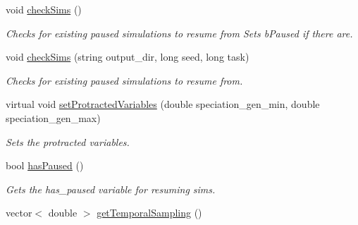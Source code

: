 \begin{DoxyCompactItemize}
void \hyperlink{class_tree_ad0bcc474a9ab1d4e3e2458c4de7304ad}{check\+Sims} ()
\begin{DoxyCompactList}\small\item\em Checks for existing paused simulations to resume from Sets b\+Paused if there are. \end{DoxyCompactList}\item 
void \hyperlink{class_tree_aafaede1da6c79583bf2e28b7a1881a5c}{check\+Sims} (string output\+\_\+dir, long seed, long task)
\begin{DoxyCompactList}\small\item\em Checks for existing paused simulations to resume from. \end{DoxyCompactList}\item 
virtual void \hyperlink{class_tree_a891764ffc1e29d3edbe0fd08e67a184b}{set\+Protracted\+Variables} (double speciation\+\_\+gen\+\_\+min, double speciation\+\_\+gen\+\_\+max)
\begin{DoxyCompactList}\small\item\em Sets the protracted variables. \end{DoxyCompactList}\item 
bool \hyperlink{class_tree_ae07761c0a91a44ebe459904b1b8ffb43}{has\+Paused} ()
\begin{DoxyCompactList}\small\item\em Gets the has\+\_\+paused variable for resuming sims. \end{DoxyCompactList}\item 
vector$<$ double $>$ \hyperlink{class_tree_ac03c034a5730ee4f4d8727aace776412}{get\+Temporal\+Sampling} ()\hypertarget{class_tree_ac03c034a5730ee4f4d8727aace776412}{}\label{class_tree_ac03c034a5730ee4f4d8727aace776412}


\end{DoxyCompactItemize}
